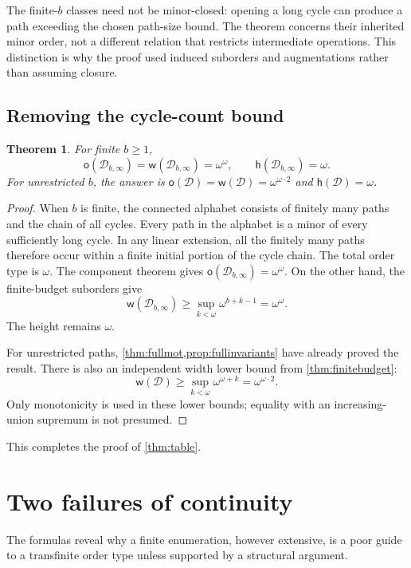 \documentclass[11pt,letterpaper]{article}
\theoremstyle{plain}
\newtheorem{theorem}{Theorem}[section]
\theoremstyle{definition}
\theoremstyle{remark}
\newcommand{\mot}{\mathsf o}
\newcommand{\wid}{\mathsf w}
\newcommand{\hei}{\mathsf h}
\newcommand{\DG}{\mathcal D}
\newcommand{\Inf}{\infty}
\begin{document}
The finite-$b$ classes need not be minor-closed: opening a long
cycle can produce a path exceeding the chosen path-size bound.
The theorem concerns their inherited minor order, not a different
relation that restricts intermediate operations. This distinction
is why the proof used induced suborders and augmentations rather
than assuming closure.

\subsection{Removing the cycle-count bound}

\begin{theorem}\label{thm:unlimitedbudget}
For finite $b\ge1$,
\[
 \mot(\DG_{b,\Inf})=\wid(\DG_{b,\Inf})=\omega^\omega,
 \qquad\hei(\DG_{b,\Inf})=\omega.
\]
For unrestricted $b$, the answer is
$\mot(\DG)=\wid(\DG)=\omega^{\omega\cdot2}$ and $\hei(\DG)=\omega$.
\end{theorem}

\begin{proof}
When $b$ is finite, the connected alphabet consists of finitely many
paths and the chain of all cycles. Every path in the alphabet is a
minor of every sufficiently long cycle. In any linear extension,
all the finitely many paths therefore occur within a finite initial
portion of the cycle chain. The total order type is $\omega$.
The component theorem gives $\mot(\DG_{b,\Inf})=\omega^\omega$.
On the other hand, the finite-budget suborders give
\[
 \wid(\DG_{b,\Inf})\ge\sup_{k<\omega}\omega^{b+k-1}
 =\omega^\omega.
\]
The height remains $\omega$.

For unrestricted paths, \cref{thm:fullmot,prop:fullinvariants} have
already proved the result. There is also an independent width lower
bound from \cref{thm:finitebudget}:
\[
 \wid(\DG)\ge\sup_{k<\omega}\omega^{\omega+k}
 =\omega^{\omega\cdot2}.
\]
Only monotonicity is used in these lower bounds; equality with an
increasing-union supremum is not presumed.
\end{proof}

This completes the proof of \cref{thm:table}.

\section{Two failures of continuity}\label{sec:limits}

The formulas reveal why a finite enumeration, however extensive,
is a poor guide to a transfinite order type unless supported by a
structural argument.
\end{document}
